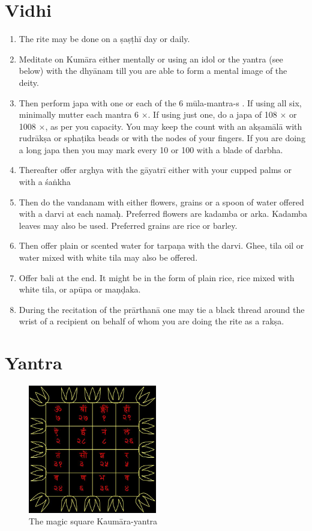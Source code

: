 \documentclass[13pt]{article}
\begin{document}
{\section{Vidhi}
\begin{enumerate}
\item The rite may be done on a ṣaṣṭhī day or daily.
\item Meditate on Kumāra either mentally or using an idol or the yantra (see below) with the dhyānam till you are able to form a mental image of the deity.
\item  Then perform japa with one or each of the 6 mūla-mantra-s . If using all six, minimally mutter each mantra 6 $\times$. If using just one, do a japa of 108 $\times$ or 1008 $\times$, as per you capacity. You may keep the count with an akṣamālā with rudrākṣa or sphaṭika beads or with the nodes of your fingers. If you are doing a long japa then you may mark every 10 or 100 with a blade of darbha.
\item  Thereafter offer arghya with the gāyatrī either with your cupped palms or with a śaṅkha
\item Then do the vandanam with either flowers, grains or a spoon of water offered with a darvi at each namaḥ. Preferred flowers are kadamba or arka. Kadamba leaves may also be used. Preferred grains are rice or barley.
\item Then offer plain or scented water for tarpaṇa with the darvi. Ghee, tila oil or water mixed with white tila may also be offered.
\item Offer bali at the end. It might be in the form of plain rice, rice mixed with white tila, or  apūpa or maṇḍaka.
\item During the recitation of the prārthanā one may tie a black thread around the wrist of a recipient on behalf of whom you are doing the rite as a rakṣa.
\end{enumerate} 
\section{Yantra}
\begin{figure}[h]
  \centering
    \includegraphics[width=0.5\textwidth]{kaumara_magic_square}
    \caption{The magic square Kaumāra-yantra}
    \label{fig:fig1}
    \end{figure}
    
}
\end{document}

